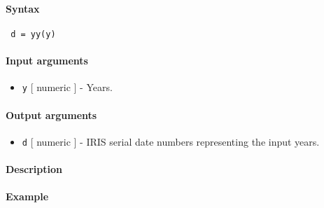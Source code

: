 


	\paragraph{Syntax}
 
 \begin{verbatim}
 d = yy(y)
 \end{verbatim}
 
 \paragraph{Input arguments}
 
 \begin{itemize}
 \item
   \texttt{y} {[} numeric {]} - Years.
 \end{itemize}
 
 \paragraph{Output arguments}
 
 \begin{itemize}
 \item
   \texttt{d} {[} numeric {]} - IRIS serial date numbers representing the
   input years.
 \end{itemize}
 
 \paragraph{Description}
 
 \paragraph{Example}


